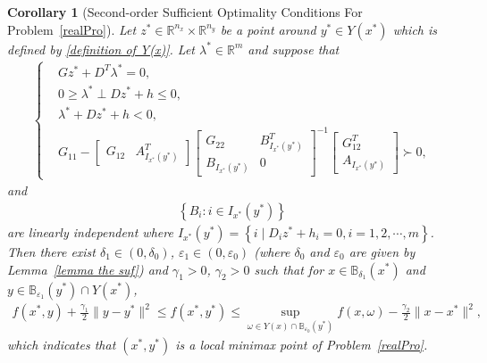 \documentclass{article}
\newtheorem{corollary}{Corollary}
\begin{document}
	\begin{corollary}[Second-order Sufficient Optimality Conditions For Problem~\eqref{realPro}]\label{corollary}
		Let $z^{\ast} \in \mathbb{R}^{n_{x}}\times\mathbb{R}^{n_{y}}$ be a point around $y^{\ast} \in Y(x^{\ast})$ which is defined by \eqref{definition of Y(x)}. Let $\lambda^{\ast} \in \mathbb{R}^{m}$ and suppose that
		\begin{align*}
			\left\lbrace\begin{aligned}
				& Gz^{\ast} + D^{T}\lambda^{\ast} = 0,\\
				& 0 \geq \lambda^{\ast} \perp Dz^{\ast} + h \leq 0,\\
				& \lambda^{\ast} + Dz^{\ast} + h < 0,\\
				& G_{11} - \begin{bmatrix}
					G_{12} & A_{I_{x^{\ast}}(y^{\ast})}^{T}
				\end{bmatrix} \begin{bmatrix}
					G_{22} & B_{I_{x^{\ast}}(y^{\ast})}^{T}\\
					B_{I_{x^{\ast}}(y^{\ast})} & 0
				\end{bmatrix}^{-1} \begin{bmatrix}
					G_{12}^{T}\\
					A_{I_{x^{\ast}}(y^{\ast})}
				\end{bmatrix} \succ 0,
			\end{aligned}\right.
		\end{align*}
		and 
		\begin{align*}
			\left\lbrace B_{i} : i\in I_{x^{\ast}}(y^{\ast})\right\rbrace
		\end{align*}
		are linearly independent where $I_{x^{\ast}}(y^{\ast}) = \left\lbrace i \mid D_{i}z^{\ast} + h_{i} = 0, i = 1, 2, \cdots, m\right\rbrace$. Then there exist $\delta_{1} \in (0, \delta_{0})$, $\varepsilon_{1}\in(0, \varepsilon_{0})$ (where $\delta_{0}$ and $\varepsilon_{0}$ are given by Lemma~\ref{lemma the suf}) and $\gamma_{1} > 0$, $\gamma_{2} > 0$ such that for $x\in\mathbb{B}_{\delta_{1}}(x^{\ast})$ and $y \in \mathbb{B}_{\varepsilon_{1}}(y^{\ast})\cap Y(x^{\ast})$,
		\begin{align*}
			f(x^{\ast}, y) + \frac{\gamma_{1}}{2}\|y - y^{\ast}\|^{2} \leq f(x^{\ast}, y^{\ast}) \leq \sup_{\omega \in Y(x)\cap\mathbb{B}_{\varepsilon_{0}}(y^{\ast})} f(x, \omega) - \frac{\gamma_{2}}{2}\|x - x^{\ast}\|^{2},
		\end{align*}
		which indicates that $(x^{\ast}, y^{\ast})$ is a local minimax point of Problem~\eqref{realPro}.
	\end{corollary}
	
\end{document}
